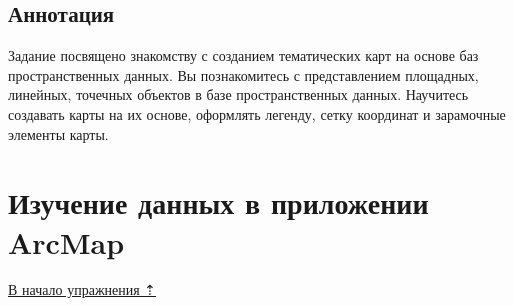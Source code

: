 \documentclass[]{book}
\theoremstyle{definition}
\theoremstyle{definition}
\theoremstyle{definition}
\theoremstyle{remark}
\begin{document}
\hypertarget{map-design-quaternary-annotation}{%
\subsection{Аннотация}\label{map-design-quaternary-annotation}}

Задание посвящено знакомству с созданием тематических карт на основе баз
пространственных данных. Вы познакомитесь с представлением площадных,
линейных, точечных объектов в базе пространственных данных. Научитесь
создавать карты на их основе, оформлять легенду, сетку координат и
зарамочные элементы карты.

\hypertarget{map-design-quaternary-data}{%
\section{Изучение данных в приложении
ArcMap}\label{map-design-quaternary-data}}

\protect\hyperlink{map-design-quaternary}{В начало упражнения ⇡}
\end{document}
